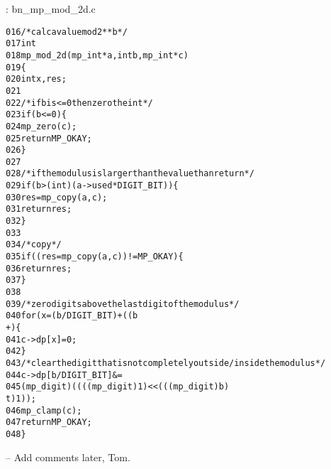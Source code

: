 \documentclass[b5paper]{book}
\begin{document}
\vspace{+3mm}\begin{small}
\hspace{-5.1mm}{\bf File}: bn\_mp\_mod\_2d.c
\vspace{-3mm}
\begin{alltt}
016   /* calc a value mod 2**b */
017   int
018   mp_mod_2d (mp_int * a, int b, mp_int * c)
019   \{
020     int     x, res;
021   
022     /* if b is <= 0 then zero the int */
023     if (b <= 0) \{
024       mp_zero (c);
025       return MP_OKAY;
026     \}
027   
028     /* if the modulus is larger than the value than return */
029     if (b > (int) (a->used * DIGIT_BIT)) \{
030       res = mp_copy (a, c);
031       return res;
032     \}
033   
034     /* copy */
035     if ((res = mp_copy (a, c)) != MP_OKAY) \{
036       return res;
037     \}
038   
039     /* zero digits above the last digit of the modulus */
040     for (x = (b / DIGIT_BIT) + ((b % DIGIT_BIT) == 0 ? 0 : 1); x < c->used; x+
      +) \{
041       c->dp[x] = 0;
042     \}
043     /* clear the digit that is not completely outside/inside the modulus */
044     c->dp[b / DIGIT_BIT] &=
045       (mp_digit) ((((mp_digit) 1) << (((mp_digit) b) % DIGIT_BIT)) - ((mp_digi
      t) 1));
046     mp_clamp (c);
047     return MP_OKAY;
048   \}
\end{alltt}
\end{small}

-- Add comments later, Tom.
\end{document}
